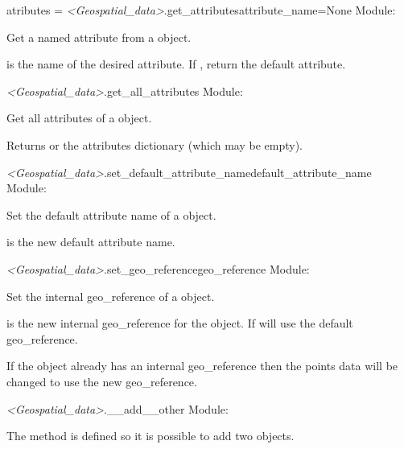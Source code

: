 \documentclass{manual}
\begin{document}
\begin{methoddesc}{atributes = \emph{<Geospatial_data>}.get_attributes}{attribute_name=None}
Module: 

Get a named attribute from a  object.

 is the name of the desired attribute.  If , return
the default attribute.
\end{methoddesc}

\begin{methoddesc}{\emph{<Geospatial_data>}.get_all_attributes}{}
Module: 

Get all attributes of a  object.

Returns  or the attributes dictionary (which may be empty).
\end{methoddesc}

\begin{methoddesc}{\emph{<Geospatial_data>}.set_default_attribute_name}{default_attribute_name}
Module: 

Set the default attribute name of a  object.

 is the new default attribute name.
\end{methoddesc}

\begin{methoddesc}{\emph{<Geospatial_data>}.set_geo_reference}{geo_reference}
Module: 

Set the internal geo_reference of a  object.

 is the new internal geo_reference for the object.
If  will use the default geo_reference.

If the  object already has an internal geo_reference
then the points data will be changed to use the new geo_reference.
\end{methoddesc}

\begin{methoddesc}{\emph{<Geospatial_data>}.__add__}{other}
Module: 

The  method is defined so it is possible to add two
 objects.
\end{methoddesc}
\end{document}
